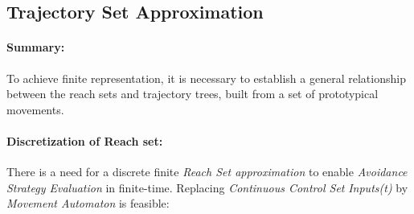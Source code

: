 \newpage
\subsection{Trajectory Set Approximation}\label{sec:trajectory set Reach set approximation}

	\paragraph{Summary:} To achieve finite representation, it is necessary to establish a general relationship between the reach sets and trajectory trees, built from a set of prototypical movements.
	
	
    \paragraph{Discretization of Reach set:} There is a need for a discrete finite \emph{Reach Set approximation} to enable \emph{Avoidance Strategy Evaluation} in finite-time. Replacing \emph{Continuous Control Set} \emph{Inputs(t)} by \emph{Movement Automaton} is feasible:
    
